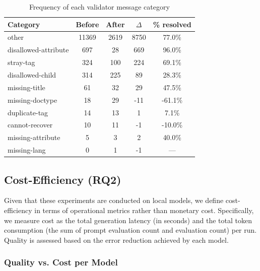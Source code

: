 \begin{table}[H]
	\centering
	\begin{tabular}{lcccc}
		\toprule
		Category             & Before & After & $\Delta$ & \% resolved \\
		\midrule
		other                & 11369  & 2619  & 8750     & 77.0\%      \\
		disallowed-attribute & 697    & 28    & 669      & 96.0\%      \\
		stray-tag            & 324    & 100   & 224      & 69.1\%      \\
		disallowed-child     & 314    & 225   & 89       & 28.3\%      \\
		missing-title        & 61     & 32    & 29       & 47.5\%      \\
		missing-doctype      & 18     & 29    & -11      & -61.1\%     \\
		duplicate-tag        & 14     & 13    & 1        & 7.1\%       \\
		cannot-recover       & 10     & 11    & -1       & -10.0\%     \\
		missing-attribute    & 5      & 3     & 2        & 40.0\%      \\
		missing-lang         & 0      & 1     & -1       & ---         \\
		\bottomrule
	\end{tabular}
	\vspace{0.5em}
	\caption{Frequency of each validator message category}
	\label{tab:rq1-error-categories}
\end{table}


\subsection{Cost-Efficiency (RQ2)}


Given that these experiments are conducted on local models, we define cost-efficiency in terms of operational metrics rather than monetary cost. Specifically, we measure cost as the total generation latency (in seconds) and the total token consumption (the sum of prompt evaluation count and evaluation count) per run. Quality is assessed based on the error reduction achieved by each model.


\subsubsection{Quality vs. Cost per Model}

